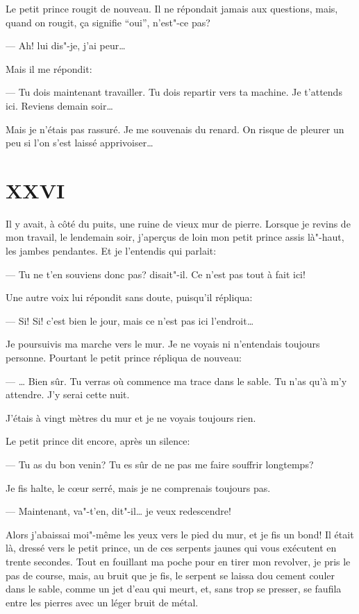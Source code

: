 Le petit prince rougit de nouveau. Il ne répondait jamais aux questions, mais, quand
on rougit, ça signifie ``oui'', n'est"-ce pas?

--- Ah! lui dis"-je, j'ai peur\ldots{}

Mais il me répondit:

--- Tu dois maintenant travailler. Tu dois repartir vers ta machine. Je t'attends ici.
Reviens demain soir\ldots{}

Mais je n'étais pas rassuré. Je me souvenais du renard. On risque de pleurer un peu
si l'on s'est laissé apprivoiser\ldots{}

\section{XXVI}

Il y avait, à côté du puits, une ruine de vieux mur de pierre. Lorsque je
revins de mon travail, le lendemain soir, j'aperçus de loin mon petit prince
assis là"-haut, les jambes pendantes. Et je l'entendis qui parlait:

--- Tu ne t'en souviens donc pas? disait"-il. Ce n'est pas tout à fait ici!

Une autre voix lui répondit sans doute, puisqu'il répliqua:

--- Si! Si! c'est bien le jour, mais ce n'est pas ici l'endroit\ldots{}

Je poursuivis ma marche vers le mur. Je ne voyais ni n'entendais toujours
personne. Pourtant le petit prince répliqua de nouveau:

--- \ldots{} Bien sûr. Tu verras où commence ma trace dans le sable. Tu n'as
qu’à m'y attendre. J'y serai cette nuit.

J'étais à vingt mètres du mur et je ne voyais toujours rien.

Le petit prince dit encore, après un silence:

--- Tu as du bon venin? Tu es sûr de ne pas me faire souffrir longtemps?

Je fis halte, le cœur serré, mais je ne comprenais toujours pas.

--- Maintenant, va"-t'en, dit"-il\ldots{} je veux redescendre!

Alors j'abaissai moi"-même les yeux vers le pied du mur, et je fis un bond!
Il était là, dressé vers le petit prince, un de ces serpents jaunes qui vous
exécutent en trente secondes. Tout en fouillant ma poche pour en tirer mon
revolver, je pris le pas de course, mais, au bruit que je fis, le serpent se
laissa dou cement couler dans le sable, comme un jet d'eau qui meurt, et,
sans trop se presser, se faufila entre les pierres avec un léger bruit de
métal.

